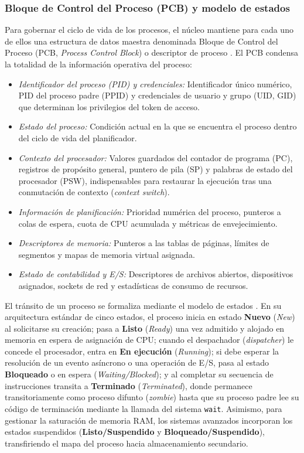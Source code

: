 \documentclass[12pt]{article}
\begin{document}
\subsubsection{Bloque de Control del Proceso (PCB) y modelo de estados}
Para gobernar el ciclo de vida de los procesos, el núcleo mantiene para cada uno de ellos una estructura de datos maestra denominada Bloque de Control del Proceso (PCB, \textit{Process Control Block}) o descriptor de proceso \parencite[\S 3.2, pp.\ 115--121]{stallings2018operating}. El PCB condensa la totalidad de la información operativa del proceso:
\begin{itemize}[noitemsep, topsep=1pt]
    \item \textit{Identificador del proceso (PID) y credenciales:} Identificador único numérico, PID del proceso padre (PPID) y credenciales de usuario y grupo (UID, GID) que determinan los privilegios del token de acceso.
    \item \textit{Estado del proceso:} Condición actual en la que se encuentra el proceso dentro del ciclo de vida del planificador.
    \item \textit{Contexto del procesador:} Valores guardados del contador de programa (PC), registros de propósito general, puntero de pila (SP) y palabras de estado del procesador (PSW), indispensables para restaurar la ejecución tras una conmutación de contexto (\textit{context switch}).
    \item \textit{Información de planificación:} Prioridad numérica del proceso, punteros a colas de espera, cuota de CPU acumulada y métricas de envejecimiento.
    \item \textit{Descriptores de memoria:} Punteros a las tablas de páginas, límites de segmentos y mapas de memoria virtual asignada.
    \item \textit{Estado de contabilidad y E/S:} Descriptores de archivos abiertos, dispositivos asignados, sockets de red y estadísticas de consumo de recursos.
\end{itemize}

El tránsito de un proceso se formaliza mediante el modelo de estados \parencite[\S 3.2, pp.\ 110--115]{stallings2018operating}. En su arquitectura estándar de cinco estados, el proceso inicia en estado \textbf{Nuevo} (\textit{New}) al solicitarse su creación; pasa a \textbf{Listo} (\textit{Ready}) una vez admitido y alojado en memoria en espera de asignación de CPU; cuando el despachador (\textit{dispatcher}) le concede el procesador, entra en \textbf{En ejecución} (\textit{Running}); si debe esperar la resolución de un evento asíncrono o una operación de E/S, pasa al estado \textbf{Bloqueado} o en espera (\textit{Waiting/Blocked}); y al completar su secuencia de instrucciones transita a \textbf{Terminado} (\textit{Terminated}), donde permanece transitoriamente como proceso difunto (\textit{zombie}) hasta que su proceso padre lee su código de terminación mediante la llamada del sistema \texttt{wait}. Asimismo, para gestionar la saturación de memoria RAM, los sistemas avanzados incorporan los estados suspendidos (\textbf{Listo/Suspendido} y \textbf{Bloqueado/Suspendido}), transfiriendo el mapa del proceso hacia almacenamiento secundario.
\end{document}
